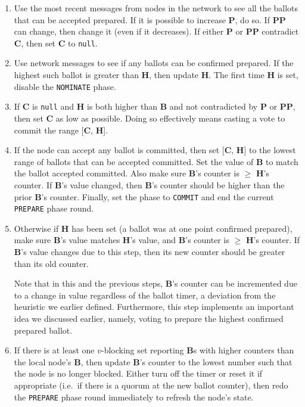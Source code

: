 \begin{enumerate}
    \item Use the most recent messages from nodes in the network to see all the ballots that can be accepted prepared. If it is possible to increase \textbf{P}, do so. If \textbf{PP} can change, then change it (even if it decreases). If either \textbf{P} or \textbf{PP} contradict \textbf{C}, then set \textbf{C} to {\tt null}.

    \item Use network messages to see if any ballots can be confirmed prepared. If the highest such ballot is greater than \textbf{H}, then update \textbf{H}. The first time \textbf{H} is set, disable the {\tt NOMINATE} phase.

    \item If \textbf{C} is {\tt null} and \textbf{H} is both higher than \textbf{B} and not contradicted by \textbf{P} or \textbf{PP}, then set \textbf{C} as low as possible. Doing so effectively means casting a vote to commit the range [\textbf{C}, \textbf{H}].

    \item If the node can accept any ballot is committed, then set [\textbf{C}, \textbf{H}] to the lowest range of ballots that can be accepted committed. Set the value of \textbf{B} to match the ballot accepted committed. Also make sure \textbf{B}'s counter is $\geq$ \textbf{H}'s counter. If \textbf{B}'s value changed, then \textbf{B}'s counter should be higher than the prior \textbf{B}'s counter. Finally, set the phase to {\tt COMMIT} and end the current {\tt PREPARE} phase round.

    \item Otherwise if \textbf{H} has been set (a ballot was at one point confirmed prepared), make sure \textbf{B}'s value matches \textbf{H}'s value, and \textbf{B}'s counter is $\geq$ \textbf{H}'s counter. If \textbf{B}'s value changes due to this step, then its new counter should be greater than its old counter.

    Note that in this and the previous steps, \textbf{B}'s counter can be incremented due to a change in value regardless of the ballot timer, a deviation from the heuristic we earlier defined. Furthermore, this step implements an important idea we discussed earlier, namely, voting to prepare the highest confirmed prepared ballot.

    \item If there is at least one $v$-blocking set reporting \textbf{B}s with higher counters than the local node's \textbf{B}, then update \textbf{B}'s counter to the lowest number such that the node is no longer blocked. Either turn off the timer or reset it if appropriate (i.e.\ if there is a quorum at the new ballot counter), then redo the {\tt PREPARE} phase round immediately to refresh the node's state.
\end{enumerate}

